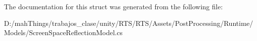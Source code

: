 The documentation for this struct was generated from the following file\+:\begin{DoxyCompactItemize}
\item 
D\+:/mah\+Things/trabajos\+\_\+clase/unity/\+R\+T\+S/\+R\+T\+S/\+Assets/\+Post\+Processing/\+Runtime/\+Models/Screen\+Space\+Reflection\+Model.\+cs\end{DoxyCompactItemize}
